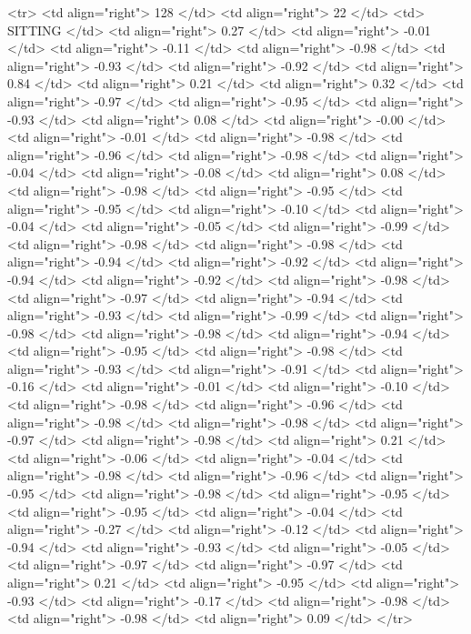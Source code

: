   <tr> <td align="right"> 128 </td> <td align="right">  22 </td> <td> SITTING </td> <td align="right"> 0.27 </td> <td align="right"> -0.01 </td> <td align="right"> -0.11 </td> <td align="right"> -0.98 </td> <td align="right"> -0.93 </td> <td align="right"> -0.92 </td> <td align="right"> 0.84 </td> <td align="right"> 0.21 </td> <td align="right"> 0.32 </td> <td align="right"> -0.97 </td> <td align="right"> -0.95 </td> <td align="right"> -0.93 </td> <td align="right"> 0.08 </td> <td align="right"> -0.00 </td> <td align="right"> -0.01 </td> <td align="right"> -0.98 </td> <td align="right"> -0.96 </td> <td align="right"> -0.98 </td> <td align="right"> -0.04 </td> <td align="right"> -0.08 </td> <td align="right"> 0.08 </td> <td align="right"> -0.98 </td> <td align="right"> -0.95 </td> <td align="right"> -0.95 </td> <td align="right"> -0.10 </td> <td align="right"> -0.04 </td> <td align="right"> -0.05 </td> <td align="right"> -0.99 </td> <td align="right"> -0.98 </td> <td align="right"> -0.98 </td> <td align="right"> -0.94 </td> <td align="right"> -0.92 </td> <td align="right"> -0.94 </td> <td align="right"> -0.92 </td> <td align="right"> -0.98 </td> <td align="right"> -0.97 </td> <td align="right"> -0.94 </td> <td align="right"> -0.93 </td> <td align="right"> -0.99 </td> <td align="right"> -0.98 </td> <td align="right"> -0.98 </td> <td align="right"> -0.94 </td> <td align="right"> -0.95 </td> <td align="right"> -0.98 </td> <td align="right"> -0.93 </td> <td align="right"> -0.91 </td> <td align="right"> -0.16 </td> <td align="right"> -0.01 </td> <td align="right"> -0.10 </td> <td align="right"> -0.98 </td> <td align="right"> -0.96 </td> <td align="right"> -0.98 </td> <td align="right"> -0.98 </td> <td align="right"> -0.97 </td> <td align="right"> -0.98 </td> <td align="right"> 0.21 </td> <td align="right"> -0.06 </td> <td align="right"> -0.04 </td> <td align="right"> -0.98 </td> <td align="right"> -0.96 </td> <td align="right"> -0.95 </td> <td align="right"> -0.98 </td> <td align="right"> -0.95 </td> <td align="right"> -0.95 </td> <td align="right"> -0.04 </td> <td align="right"> -0.27 </td> <td align="right"> -0.12 </td> <td align="right"> -0.94 </td> <td align="right"> -0.93 </td> <td align="right"> -0.05 </td> <td align="right"> -0.97 </td> <td align="right"> -0.97 </td> <td align="right"> 0.21 </td> <td align="right"> -0.95 </td> <td align="right"> -0.93 </td> <td align="right"> -0.17 </td> <td align="right"> -0.98 </td> <td align="right"> -0.98 </td> <td align="right"> 0.09 </td> </tr>
